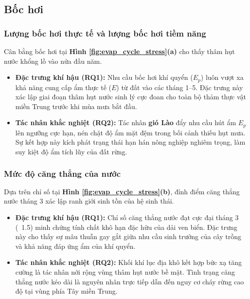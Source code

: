 \documentclass[12pt,a4paper]{article}
\begin{document}
\subsection{Bốc hơi}

\subsubsection{Lượng bốc hơi thực tế và lượng bốc hơi tiềm năng}
Cân bằng bốc hơi tại \textbf{Hình \ref{fig:evap_cycle_stress}(a)} cho thấy thâm hụt nước khổng lồ vào nửa đầu năm.

\begin{itemize}
    \item \textbf{Đặc trưng khí hậu (RQ1):} Nhu cầu bốc hơi khí quyển ($E_p$) luôn vượt xa khả năng cung cấp ẩm thực tế ($E$) từ đất vào các tháng 1--5. Đặc trưng này xác lập giai đoạn thâm hụt nước sinh lý cực đoan cho toàn bộ thảm thực vật miền Trung trước khi mùa mưa bắt đầu.
    \item \textbf{Tác nhân khắc nghiệt (RQ2):} Tác nhân \textbf{gió Lào} đẩy nhu cầu hút ẩm $E_p$ lên ngưỡng cực hạn, nén chặt độ ẩm mặt đệm trong bối cảnh thiếu hụt mưa. Sự kết hợp này kích phát trạng thái hạn hán nông nghiệp nghiêm trọng, làm suy kiệt độ ẩm tích lũy của đất rừng.
\end{itemize}

\subsubsection{Mức độ căng thẳng của nước}
Dựa trên chỉ số tại \textbf{Hình \ref{fig:evap_cycle_stress}(b)}, đỉnh điểm căng thẳng nước tháng 3 xác lập ranh giới sinh tồn của hệ sinh thái.

\begin{itemize}
    \item \textbf{Đặc trưng khí hậu (RQ1):} Chỉ số căng thẳng nước đạt cực đại tháng 3 (~1.5) minh chứng tính chất khô hạn đặc hữu của dải ven biển. Đặc trưng này cho thấy sự mâu thuẫn gay gắt giữa nhu cầu sinh trưởng của cây trồng và khả năng đáp ứng ẩm của khí quyển.
    \item \textbf{Tác nhân khắc nghiệt (RQ2):} Khối khí lục địa khô kết hợp bức xạ tăng cường là tác nhân nới rộng vùng thâm hụt nước bề mặt. Tình trạng căng thẳng nước kéo dài là nguyên nhân trực tiếp dẫn đến nguy cơ cháy rừng cao độ tại vùng phía Tây miền Trung.
\end{itemize}
\end{document}
